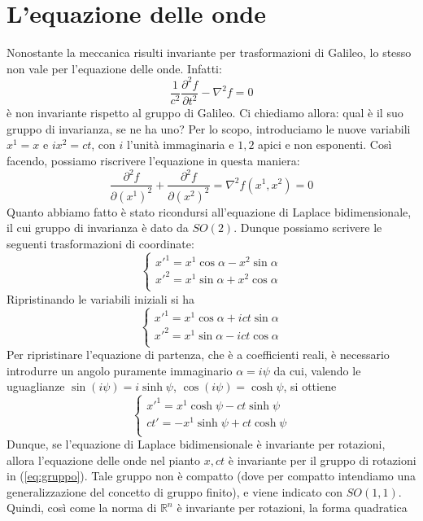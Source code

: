 \documentclass[a4paper,11pt]{book}
\theoremstyle{plain}
\theoremstyle{definition}
\begin{document}
\section{L'equazione delle onde}
Nonostante la meccanica risulti invariante per trasformazioni di Galileo, lo stesso non vale per l'equazione delle onde. Infatti:
\[
\frac{1}{c^2}\frac{\partial^2f}{\partial t^2}-\nabla^2f=0
\]
è non invariante rispetto al gruppo di Galileo. Ci chiediamo allora: qual è il suo gruppo di invarianza, se ne ha uno? Per lo scopo, introduciamo le nuove variabili $x^1=x$ e $ix^2=ct$, con $i$ l'unità immaginaria e $1,2$ apici e non esponenti. Così facendo, possiamo riscrivere l'equazione in questa maniera:
\[
\frac{\partial^2f}{\partial (x^1)^2}+\frac{\partial^2f}{\partial (x^2)^2}=\nabla^2f(x^1,x^2)=0
\]
Quanto abbiamo fatto è stato ricondursi all'equazione di Laplace bidimensionale, il cui gruppo di invarianza è dato da $SO(2)$. Dunque possiamo scrivere le seguenti trasformazioni di coordinate:
\[
\begin{cases}
x'^1=x^1\cos\alpha-x^2\sin\alpha \\
x'^2=x^1\sin\alpha+x^2\cos\alpha \\
\end{cases}
\]
Ripristinando le variabili iniziali si ha
\[
\begin{cases}
x'^1=x^1\cos\alpha+ict\sin\alpha \\
x'^2=x^1\sin\alpha-ict\cos\alpha \\
\end{cases}
\]
Per ripristinare l'equazione di partenza, che è a coefficienti reali, è necessario introdurre un angolo puramente immaginario $\alpha=i\psi$ da cui, valendo le uguaglianze $\sin(i\psi)=i\sinh\psi$, $\cos(i\psi)=\cosh\psi$, si ottiene
\begin{equation}\label{eq:gruppo}
\begin{cases}
x'^1=x^1\cosh\psi-ct\sinh\psi \\
ct'=-x^1\sinh\psi+ct\cosh\psi \\
\end{cases}
\end{equation} 
Dunque, se l'equazione di Laplace bidimensionale è invariante per rotazioni, allora l'equazione delle onde nel pianto $x,ct$ è invariante per il gruppo di rotazioni in (\ref{eq:gruppo}). Tale gruppo non è compatto (dove per compatto intendiamo una generalizzazione del concetto di gruppo finito), e viene indicato con $SO(1,1)$. Quindi, così come la norma di $\mathbb{R}^n$ è invariante per rotazioni, la forma quadratica
\end{document}
